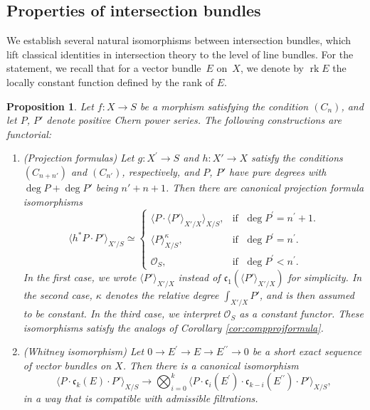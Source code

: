 \documentclass[11pt]{article}
\theoremstyle{plain}
\newtheorem{proposition}[theorem]{Proposition}
\theoremstyle{definition}
\newcommand{\Ocal}{\mathcal O}
\newcommand{\cfrak}{\mathfrak c}
\newcommand{\bis}{\prime\prime}
\DeclareMathOperator{\rk}{rk}
\begin{document}
\subsection{Properties of intersection bundles}\label{subsec:properties-of-intersection-bundles} We establish several natural isomorphisms between intersection bundles, which lift classical identities in intersection theory to the level of line bundles. For the statement, we recall that for a vector bundle~$E$ on~$X$, we denote by $\rk E$ the locally constant function defined by the rank of $E$.

\begin{proposition} \label{prop:properties-chern-bundles}
Let $f\colon X\to S$ be a morphism satisfying the condition $(C_{n})$, and let $P$, $P'$ denote positive Chern power series. The following constructions are functorial:
\begin{enumerate}

\item\label{item:projection-fromula} (Projection formulas) Let $g\colon X^{\prime}\to S$ and $h \colon X' \to X$ satisfy the conditions $(C_{n+n'})$ and $(C_{n'})$, respectively, and $P$, $P'$ have pure degrees with $\deg P + \deg P'$ being $n'+n+1$. Then there are canonical projection formula isomorphisms
\begin{displaymath}
\langle h^\ast P \cdot P' \rangle_{X'/S} \simeq
\begin{cases}
\langle P\cdot \langle P' \rangle_{X'/X} \rangle_{X/S}, & \text{if }\; \deg P^{\prime}=n^{\prime}+1.\\
\langle P \rangle_{X/S}^{\kappa}, & \text{if }\; \deg P^{\prime} = n^{\prime}. \\
\Ocal_S, & \text{if }\; \deg P^{\prime} < n^{\prime}.
\end{cases}
\end{displaymath}
In the first case, we wrote $\langle P' \rangle_{X'/X}$ instead of $\cfrak_{1}(\langle P' \rangle_{X'/X})$ for simplicity. In the second case, $\kappa$ denotes the relative degree $\int_{X'/X} P'$, and is then assumed to be constant. In the third case, we interpret $\Ocal_S$ as a constant functor. These isomorphisms satisfy the analogs of Corollary \ref{cor:compprojformula}.

\item \label{whitneyiso} (Whitney isomorphism) Let $0 \to E^{\prime}\to E \to E^{\bis} \to 0$ be a short exact sequence of vector bundles on $X$. Then there is a canonical isomorphism
\begin{displaymath}
\langle P \cdot \cfrak_{k}(E)\cdot P'\rangle_{X/S} \to \bigotimes_{i=0}^{k} \langle P \cdot \cfrak_{i}(E^{\prime}) \cdot \cfrak_{k-i}(E^{\bis})\cdot P' \rangle_{X/S},
\end{displaymath}
in a way that is compatible with admissible filtrations.


\end{enumerate}
\end{proposition}
\end{document}
